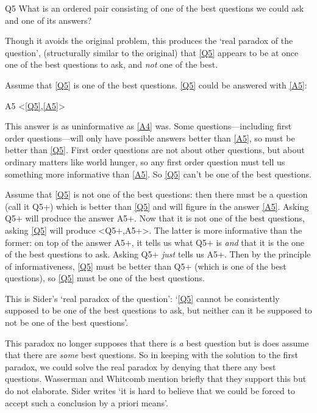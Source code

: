 	\begin{principle}{Q5}\label{Q5}
	What is an ordered pair consisting of one of the best questions we could ask and one of its answers?
	\end{principle}

Though it avoids the original problem, this produces the `real paradox of the question', (structurally similar to the original) that \ref{Q5} appears to be at once one of the best questions to ask, and \emph{not} one of the best.

Assume that \ref{Q5} is one of the best questions.
\ref{Q5} could be answered  with \ref{A5}:
	
	\begin{principle}{A5}\label{A5}
	<\ref{Q5},\ref{A5}>
	\end{principle}

This answer is as uninformative as \ref{A4} was.
Some questions---including first order questions---will only have possible answers better than \ref{A5}, so must be better than \ref{Q5}.
First order questions are not about other questions, but about ordinary matters like world hunger, so any first order question must tell us something more informative than \ref{A5}.
So \ref{Q5} can't be one of the best questions.
\parencite[4]{Sider1997}

Assume that \ref{Q5} is not one of the best questions: then there must be a question (call it Q5+) which is better than \ref{Q5} and will figure in the answer \ref{A5}.
Asking Q5+ will produce the answer A5+.
Now that it is not one of the best questions, asking \ref{Q5} will produce <Q5+,A5+>.
The latter is more informative than the former: on top of the answer A5+, it tells us what Q5+ is \emph{and} that it is the one of the best questions to ask.
Asking Q5+ \emph{just} tells us A5+.
Then by the principle of informativeness, \ref{Q5} must be better than Q5+ (which is one of the best questions), so \ref{Q5} must be one of the best questions.

This is Sider's `real paradox of the question': `\ref{Q5} cannot be consistently supposed to be one of the best questions to ask, but neither can it be supposed to not be one of the best questions'.

This paradox no longer supposes that there is \emph{a} best question but is does assume that there are \emph{some} best questions.
So in keeping with the solution to the first paradox, we could solve the real paradox by denying that there any best questions.
Wasserman and Whitcomb mention briefly that they support this but do not elaborate. 
\parencite[151]{Wasserman_2011}
Sider writes `it is hard to believe that we could be forced to accept such a conclusion by a priori means'.
\parencite[4]{Sider1997}

